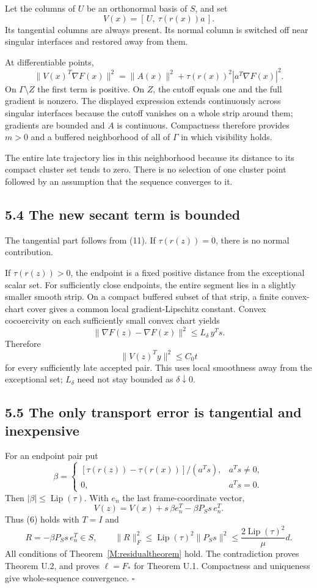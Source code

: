 Let the columns of \(U\) be an orthonormal basis of \(S\), and set \[
 \boxed{V(x)=[\,U,\ \tau(r(x))a\,].}\tag{U.12}
\] Its tangential columns are always present. Its normal column is
switched off near singular interfaces and restored away from them.

At differentiable points, \[
 \|V(x)^T\nabla F(x)\|^2
 =\|A(x)\|^2+\tau(r(x))^2|a^T\nabla F(x)|^2.
\] On \(\Gamma\setminus Z\) the first term is positive. On \(Z\), the
cutoff equals one and the full gradient is nonzero. The displayed
expression extends continuously across singular interfaces because the
cutoff vanishes on a whole strip around them; gradients are bounded and
\(A\) is continuous. Compactness therefore provides \(m>0\) and a
buffered neighborhood of all of \(\Gamma\) in which visibility holds.

The entire late trajectory lies in this neighborhood because its
distance to its compact cluster set tends to zero. There is no selection
of one cluster point followed by an assumption that the sequence
converges to it.

\subsection{5.4 The new secant term is
bounded}\label{U:the-new-secant-term-is-bounded}

The tangential part follows from (11). If \(\tau(r(z))=0\), there is no
normal contribution.

If \(\tau(r(z))>0\), the endpoint is a fixed positive distance from the
exceptional scalar set. For sufficiently close endpoints, the entire
segment lies in a slightly smaller smooth strip. On a compact buffered
subset of that strip, a finite convex-chart cover gives a common local
gradient-Lipschitz constant. Convex cocoercivity on each sufficiently
small convex chart yields \[
 \|\nabla F(z)-\nabla F(x)\|^2\le L_\delta\,y^Ts.
\] Therefore \[
 \|V(z)^Ty\|^2\le C_0t\tag{U.13}
\] for every sufficiently late accepted pair. This uses local smoothness
away from the exceptional set; \(L_\delta\) need not stay bounded as
\(\delta\downarrow0\).

\subsection{5.5 The only transport error is tangential and
inexpensive}\label{U:the-only-transport-error-is-tangential-and-inexpensive}

For an endpoint pair put \[
 \beta=\begin{cases}
 [\tau(r(z))-\tau(r(x))]/(a^Ts),&a^Ts\ne0,\\
 0,&a^Ts=0.
 \end{cases}
\] Then \(|\beta|\le\operatorname{Lip}(\tau)\). With \(e_n\) the last
frame-coordinate vector, \[
 \boxed{
 V(z)=V(x)+s\,\beta e_n^T-\beta P_Ss\,e_n^T.
 }\tag{U.14}
\] Thus (6) holds with \(T=I\) and \[
 R=-\beta P_Ss\,e_n^T\in S,
 \qquad
 \|R\|_F^2\le\operatorname{Lip}(\tau)^2\|P_Ss\|^2
 \le\frac{2\operatorname{Lip}(\tau)^2}{\mu}d.\tag{U.15}
\] All conditions of Theorem~\ref{M:residualtheorem} hold. The contradiction proves Theorem U.2,
and proves \(\ell=F_*\) for Theorem U.1. Compactness and uniqueness give
whole-sequence convergence. \(\square\)


